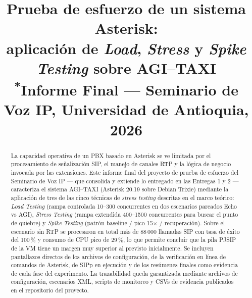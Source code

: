 \documentclass[conference]{IEEEtran}
\begin{document}
\title{Prueba de esfuerzo de un sistema Asterisk:\\
aplicaci\'on de \textit{Load}, \textit{Stress} y \textit{Spike Testing} sobre AGI--TAXI\\
{\footnotesize \textsuperscript{*}Informe Final --- Seminario de Voz IP, Universidad de Antioquia, 2026}
}

\author{
\and
{}
\and
{}
}

\maketitle

\begin{abstract}
La capacidad operativa de un PBX basado en Asterisk se ve limitada por
el procesamiento de se\~nalizaci\'on SIP, el manejo de canales RTP y la
l\'ogica de negocio invocada por las extensiones. Este informe final
del proyecto de prueba de esfuerzo del Seminario de Voz IP --- que
consolida y extiende lo entregado en las Entregas 1 y 2 ---
caracteriza el sistema AGI--TAXI (Asterisk 20.19 sobre Debian Trixie)
mediante la aplicaci\'on de tres de las cinco t\'ecnicas de
\textit{stress testing} descritas en el marco te\'orico: \textit{Load
Testing} (rampa controlada 10--300 concurrentes en dos escenarios
pareados Echo vs AGI), \textit{Stress Testing} (rampa extendida
400--1500 concurrentes para buscar el punto de quiebre) y
\textit{Spike Testing} (patr\'on baseline / pico 15$\times$ /
recuperaci\'on). Sobre el escenario sin RTP se procesaron en total
m\'as de 88\,000 llamadas SIP con tasa de \'exito del 100\,\% y consumo
de CPU pico de 29\,\%, lo que permite concluir que la pila PJSIP de la
VM tiene un margen muy superior al previsto inicialmente. Se incluyen
pantallazos directos de los archivos de configuraci\'on, de la
verificaci\'on en l\'inea de comandos de Asterisk, de SIPp en
ejecuci\'on y de los res\'umenes finales como evidencia de cada fase
del experimento. La trazabilidad queda garantizada mediante archivos
de configuraci\'on, escenarios XML, scripts de monitoreo y CSVs de
evidencia publicados en el repositorio del proyecto.
\end{abstract}
\end{document}
